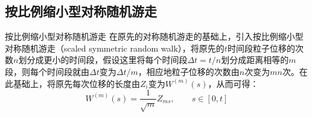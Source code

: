 \documentclass[t]{beamer}
\begin{document}
\subsection{按比例缩小型对称随机游走}
\begin{frame}{按比例缩小型对称随机游走}
  在原先的对称随机游走的基础上，引入按比例缩小型对称随机游走（scaled symmetric random walk），将原先的$t$时间段粒子位移的次数$n$划分成更小的时间段，假设这里将每个时间段$\Delta t=t/n$划分成距离相等的$m$段，则每个时间段就由$\Delta t$变为$\Delta t/m$，相应地粒子位移的次数由$n$次变为$mn$次。在此基础上，将原先每次位移的长度由$Z_i$变为$W^{(m)}(s)$，从而可得：
  \begin{equation*}
  W^{(m)}(s)=\frac{1}{\sqrt{m}}Z_{ms},\qquad s\in[0,t]
  \end{equation*}
\end{frame}
\end{document}
